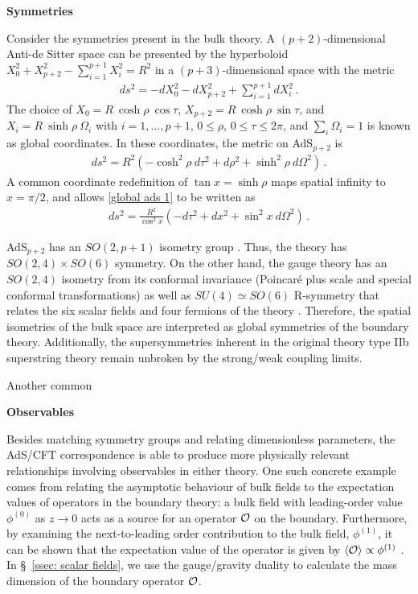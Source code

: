 \documentclass[../PhD.tex]{subfiles}
\begin{document}
{\bf Symmetries}

Consider the symmetries present in the \ads bulk theory. A $(p+2)$-dimensional Anti-de Sitter space can be presented by the hyperboloid $X_0^2 + X^2_{p+2} - \sum^{p+1}_{i=1} X_i^2 = R^2$ in a $(p+3)$-dimensional space with the metric
\begin{align}
\label{ads hyperboloid}
ds^2 = -dX_0^2 - dX_{p+2}^2 + \sum^{p+1}_{i = 1} dX^2_i \, .
\end{align}
The choice of $X_0 = R~\cosh \rho~\cos \tau$, $X_{p+2} = R~\cosh \rho~\sin \tau$, and $X_i = R~\sinh \rho~\Omega_i$ with $i=1,\ldots,p + 1$, $0 \leq \rho$, $0 \leq \tau \leq 2\pi$, and $\sum_i \Omega_i = 1$ is known as global coordinates. In these coordinates, the metric on AdS$_{p+2}$ is
\begin{align}
\label{global ads 1}
ds^2 = R^2 \left( - \cosh^2 \rho~d\tau^2 + d \rho^2 + \sinh^2 \rho~d\Omega^2 \right) \, .
\end{align}
A common coordinate redefinition of $\tan x = \sinh \rho$ maps spatial infinity to $x = \pi / 2$, and allows \eqref{global ads 1} to be written as
\begin{align}
\label{global ads 2}
ds^2 = \frac{R^2}{\cos^2 x} \left( - d\tau^2 + dx^2 + \sin^2 x~d\Omega^2 \right) \, .
\end{align}

AdS$_{p+2}$ has an $SO(2,p+1)$ isometry group \cite{hep-th/9905111}. Thus, the \ads theory has $SO(2,4)\times SO(6)$ symmetry. On the other hand, the gauge theory has an $SO(2,4)$ isometry from its conformal invariance (Poincar\'e plus scale and special conformal transformations) as well as $SU(4) \simeq SO(6)$ R-symmetry that relates the six scalar fields and four fermions of the theory \cite{1501.00007}. Therefore, the spatial isometries of the bulk space are interpreted as global symmetries of the boundary theory. Additionally, the supersymmetries inherent in the original theory type IIb superstring theory remain unbroken by the strong/weak coupling limits.

Another common
	
{\bf Observables}

Besides matching symmetry groups and relating dimensionless parameters, the AdS/CFT correspondence is able to produce more physically relevant relationships involving observables in either theory. One such concrete example comes from relating the asymptotic behaviour of bulk fields to the expectation values of operators in the boundary theory: a bulk field with leading-order value $\phi^{(0)}$ as $z \to 0$ acts as a source for an operator $\mathcal O$ on the boundary. Furthermore, by examining the next-to-leading order contribution to the bulk field, $\phi^{(1)}$, it can be shown that the expectation value of the operator is given by $\langle \mathcal O \rangle \propto \phi^{(1)}$ \cite{hep-th/9905104}. In \S~\!\ref{ssec: scalar fields}, we use the gauge/gravity duality to calculate the mass dimension of the boundary operator $\mathcal O$.
\end{document}
